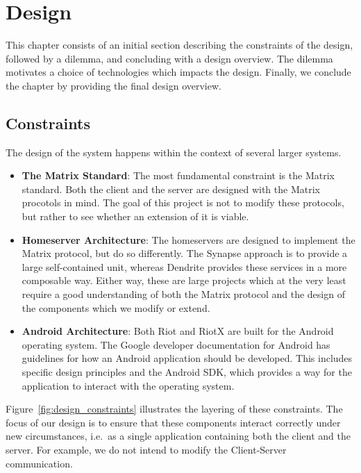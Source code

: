 \chapter{Design}
This chapter consists of an initial section describing the constraints of the design, followed by a dilemma, and concluding with a design overview.
The dilemma motivates a choice of technologies which impacts the design.
Finally, we conclude the chapter by providing the final design overview.

\section{Constraints}
The design of the system happens within the context of several larger systems.
\begin{itemize}
	\item{
	      \textbf{The Matrix Standard}:
	      The most fundamental constraint is the Matrix standard.
	      Both the client and the server are designed with the Matrix procotols in mind.
	      The goal of this project is not to modify these protocols, but rather to see whether an extension of it is viable.
	      }
	\item{
	      \textbf{Homeserver Architecture}:
	      The homeservers are designed to implement the Matrix protocol, but do so differently.
	      The Synapse approach is to provide a large self-contained unit, whereas Dendrite provides these services in a more composable way.
	      Either way, these are large projects which at the very least require a good understanding of both the Matrix protocol and the design of the components which we modify or extend.
	      }
	\item{
	      \textbf{Android Architecture}:
	      Both Riot and RiotX are built for the Android operating system.
	      The Google developer documentation for Android has guidelines for how an Android application should be developed.
	      This includes specific design principles and the Android \ac{SDK}, which provides a way for the application to interact with the operating system.
	      }
\end{itemize}

Figure~\ref{fig:design_constraints} illustrates the layering of these constraints.
The focus of our design is to ensure that these components interact correctly under new circumstances, i.e.~as a single application containing both the client and the server.
For example, we do not intend to modify the Client-Server communication.

